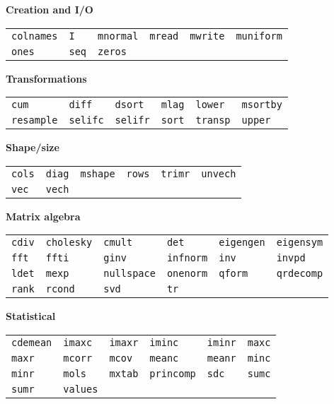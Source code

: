 \begin{table}[htbp]
\centering
\textbf{Creation and I/O}
\hrulefill

\begin{tabular}{p{\cwid}p{\cwid}p{\cwid}p{\cwid}p{\cwid}p{\cwid}}
\texttt{colnames}  &
\texttt{I}         &
\texttt{mnormal}   &
\texttt{mread}     &
\texttt{mwrite}    &
\texttt{muniform}  \\
\texttt{ones}      &
\texttt{seq}       &
\texttt{zeros}     
\end{tabular}      

\textbf{Transformations}
\hrulefill

\begin{tabular}{p{\cwid}p{\cwid}p{\cwid}p{\cwid}p{\cwid}p{\cwid}}
\texttt{cum}       &
\texttt{diff}      &
\texttt{dsort}     &
\texttt{mlag}      &
\texttt{lower}     &
\texttt{msortby}   \\
\texttt{resample}  &
\texttt{selifc}    &
\texttt{selifr}    &
\texttt{sort}      &
\texttt{transp}    &
\texttt{upper}     
\end{tabular}      

\textbf{Shape/size}
\hrulefill

\begin{tabular}{p{\cwid}p{\cwid}p{\cwid}p{\cwid}p{\cwid}p{\cwid}}
\texttt{cols}      &
\texttt{diag}      &
\texttt{mshape}    &
\texttt{rows}      &
\texttt{trimr}     &
\texttt{unvech}    \\
\texttt{vec}       &
\texttt{vech}      
\end{tabular}      

\textbf{Matrix algebra}
\hrulefill

\begin{tabular}{p{\cwid}p{\cwid}p{\cwid}p{\cwid}p{\cwid}p{\cwid}}
\texttt{cdiv}      &
\texttt{cholesky}  &
\texttt{cmult}     &
\texttt{det}       &
\texttt{eigengen}  &
\texttt{eigensym}  \\
\texttt{fft}       &
\texttt{ffti}      &
\texttt{ginv}      &
\texttt{infnorm}   &
\texttt{inv}       &
\texttt{invpd}     \\
\texttt{ldet}      &
\texttt{mexp}      &
\texttt{nullspace} &
\texttt{onenorm}   &
\texttt{qform}     &
\texttt{qrdecomp}  \\
\texttt{rank}      &
\texttt{rcond}     &
\texttt{svd}       &
\texttt{tr}        &
\end{tabular}      

\textbf{Statistical}
\hrulefill

\begin{tabular}{p{\cwid}p{\cwid}p{\cwid}p{\cwid}p{\cwid}p{\cwid}}
\texttt{cdemean}   &
\texttt{imaxc}     &
\texttt{imaxr}     &
\texttt{iminc}     &
\texttt{iminr}     &
\texttt{maxc}      \\   
\texttt{maxr}      &
\texttt{mcorr}     &
\texttt{mcov}      &
\texttt{meanc}     &
\texttt{meanr}     &
\texttt{minc}      \\   
\texttt{minr}      &
\texttt{mols}      &
\texttt{mxtab}     &
\texttt{princomp}  &
\texttt{sdc}       &
\texttt{sumc}      \\
\texttt{sumr}      &
\texttt{values}  
\end{tabular}      


\end{table}
